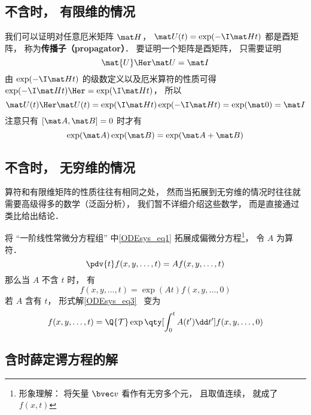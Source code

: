 

\subsection{不含时， 有限维的情况}
我们可以证明对任意厄米矩阵 $\mat H$， $\mat U(t) = \exp(-\I \mat H t)$ 都是酉矩阵， 称为\textbf{传播子（propagator）}． 要证明一个矩阵是酉矩阵， 只需要证明
\begin{equation}
\mat{U}\Her \mat U = \mat I
\end{equation}
由 $\exp(-\I \mat H t)$ 的级数定义以及厄米算符的性质可得 $\exp(-\I \mat H t)\Her = \exp(\I \mat H t)$， 所以
\begin{equation}
\mat U(t)\Her \mat U(t) = \exp(\I \mat H t) \exp(-\I \mat H t) = \exp(\mat 0) = \mat I
\end{equation}
注意只有 $[\mat A, \mat B] = 0$ 时才有
\begin{equation}
\exp(\mat A)\exp(\mat B) = \exp(\mat A + \mat B)
\end{equation}

\subsection{不含时， 无穷维的情况}

算符和有限维矩阵的性质往往有相同之处， 然而当拓展到无穷维的情况时往往就需要高级得多的数学（泛函分析）， 我们暂不详细介绍这些数学， 而是直接通过类比给出结论．

将 “一阶线性常微分方程组” 中\autoref{ODEsys_eq1} 拓展成偏微分方程\footnote{形象理解： 将矢量 $\bvec v$ 看作有无穷多个元， 且取值连续， 就成了 $f(x, t)$}， 令 $A$ 为算符．
\begin{equation}
\pdv{t} f(x, y, \dots, t) = A f(x, y, \dots, t)
\end{equation}
那么当 $A$ 不含 $t$ 时， 有
\begin{equation}
f(x, y, \dots, t) = \exp(A t) f(x, y, \dots, 0)
\end{equation}
若 $A$ 含有 $t$， 形式解\autoref{ODEsys_eq3}~ 变为
\begin{equation}
f(x, y, \dots, t) = \Q {\mathcal T} \exp\qty[\int_0^ t A(t')\dd t'] f(x, y, \dots, 0)
\end{equation}

\subsection{含时薛定谔方程的解}

